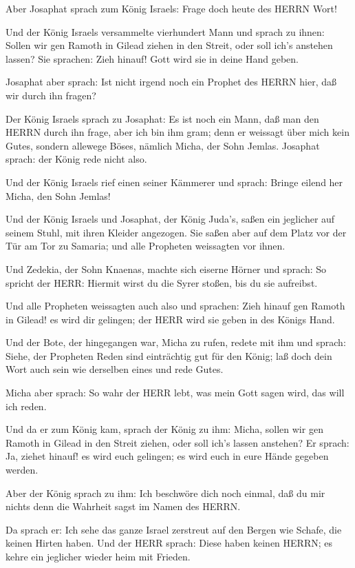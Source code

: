  Aber Josaphat sprach zum König Israels: Frage doch heute
des HERRN Wort!

 Und der König Israels versammelte vierhundert Mann und
sprach zu ihnen: Sollen wir gen Ramoth in Gilead ziehen in den Streit,
oder soll ich's anstehen lassen? Sie sprachen: Zieh hinauf! Gott wird
sie in deine Hand geben.

 Josaphat aber sprach: Ist nicht irgend noch ein Prophet des
HERRN hier, daß wir durch ihn fragen?

 Der König Israels sprach zu Josaphat: Es ist noch ein Mann,
daß man den HERRN durch ihn frage, aber ich bin ihm gram; denn er
weissagt über mich kein Gutes, sondern allewege Böses, nämlich Micha,
der Sohn Jemlas. Josaphat sprach: der König rede nicht also.

 Und der König Israels rief einen seiner Kämmerer und
sprach: Bringe eilend her Micha, den Sohn Jemlas!

 Und der König Israels und Josaphat, der König Juda's, saßen
ein jeglicher auf seinem Stuhl, mit ihren Kleider angezogen. Sie saßen
aber auf dem Platz vor der Tür am Tor zu Samaria; und alle Propheten
weissagten vor ihnen.

 Und Zedekia, der Sohn Knaenas, machte sich eiserne Hörner
und sprach: So spricht der HERR: Hiermit wirst du die Syrer stoßen, bis
du sie aufreibst.

 Und alle Propheten weissagten auch also und sprachen: Zieh
hinauf gen Ramoth in Gilead! es wird dir gelingen; der HERR wird sie
geben in des Königs Hand.

 Und der Bote, der hingegangen war, Micha zu rufen, redete
mit ihm und sprach: Siehe, der Propheten Reden sind einträchtig gut für
den König; laß doch dein Wort auch sein wie derselben eines und rede
Gutes.

 Micha aber sprach: So wahr der HERR lebt, was mein Gott
sagen wird, das will ich reden.

 Und da er zum König kam, sprach der König zu ihm: Micha,
sollen wir gen Ramoth in Gilead in den Streit ziehen, oder soll ich's
lassen anstehen? Er sprach: Ja, ziehet hinauf! es wird euch gelingen; es
wird euch in eure Hände gegeben werden.

 Aber der König sprach zu ihm: Ich beschwöre dich noch
einmal, daß du mir nichts denn die Wahrheit sagst im Namen des HERRN.

 Da sprach er: Ich sehe das ganze Israel zerstreut auf den
Bergen wie Schafe, die keinen Hirten haben. Und der HERR sprach: Diese
haben keinen HERRN; es kehre ein jeglicher wieder heim mit Frieden.

